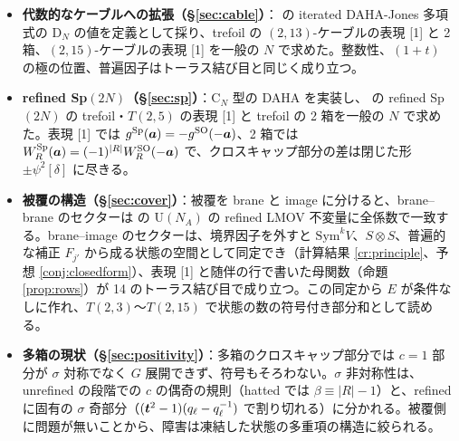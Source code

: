 \begin{itemize}
\item \textbf{代数的なケーブルへの拡張（§\ref{sec:cable}）}：\cite{CD14} の iterated DAHA-Jones 多項式の D$_N$ の値を定義として採り、trefoil の $(2,13)$-ケーブルの表現 [1] と 2 箱、$(2,15)$-ケーブルの表現 [1] を一般の $N$ で求めた。整数性、$(1+t)$ の極の位置、普遍因子はトーラス結び目と同じく成り立つ。
\item \textbf{refined Sp$(2N)$（§\ref{sec:sp}）}：C$_N$ 型の DAHA を実装し、\cite{AM22} の refined Sp$(2N)$ の trefoil・$T(2,5)$ の表現 [1] と trefoil の 2 箱を一般の $N$ で求めた。表現 [1] では $g^{\mathrm{Sp}}(\bm{a}) = -g^{\mathrm{SO}}(-\bm{a})$、2 箱では $W^{\mathrm{Sp}}_R(\bm{a}) = (-1)^{|R|} W^{\mathrm{SO}}_R(-\bm{a})$ で、クロスキャップ部分の差は閉じた形 $\pm\psi^2[\delta]$ に尽きる。
\item \textbf{被覆の構造（§\ref{sec:cover}）}：被覆を brane と image に分けると、brane--brane のセクターは \cite{KN17} の U$(N_A)$ の refined LMOV 不変量に全係数で一致する。brane--image のセクターは、境界因子を外すと $\mathrm{Sym}^k V$、$S\otimes S$、普遍的な補正 $F_{j'}$ から成る状態の空間として同定でき（計算結果 \ref{cr:principle}、予想 \ref{conj:closedform}）、表現 [1] と随伴の行で書いた母関数（命題 \ref{prop:rows}）が 14 のトーラス結び目で成り立つ。この同定から $E$ が条件なしに作れ、$T(2,3)$〜$T(2,15)$ で状態の数の符号付き部分和として読める。
\item \textbf{多箱の現状（§\ref{sec:positivity}）}：多箱のクロスキャップ部分では $c = 1$ 部分が $\sigma$ 対称でなく $G$ 展開できず、符号もそろわない。$\sigma$ 非対称性は、unrefined の段階での $c$ の偶奇の規則（hatted では $\beta \equiv |R| - 1$）と、refined に固有の $\sigma$ 奇部分（$(\bm{t}^2-1)(q_\ell - q_\ell^{-1})$ で割り切れる）に分かれる。被覆側に問題が無いことから、障害は凍結した状態の多重項の構造に絞られる。
\end{itemize}

